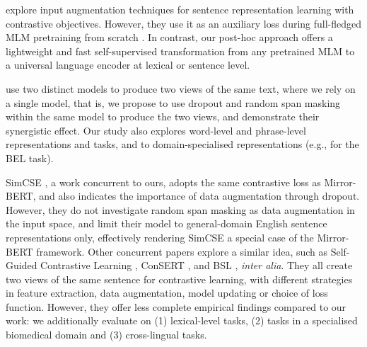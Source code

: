 \documentclass[11pt]{article}
\begin{document}
\citet{wu2020clear} explore input augmentation techniques for sentence representation learning with contrastive objectives. However, they use it as an auxiliary loss during full-fledged MLM pretraining from scratch \citep{rethmeier2021primer}. In contrast, our post-hoc approach offers a lightweight and fast self-supervised transformation from any pretrained MLM to a universal language encoder at lexical or sentence level.


\citet{carlsson2021semantic} use two distinct models to produce two views of the same text, where we rely on a single model, that is, we propose to use dropout and random span masking within the same model to produce the two views, and demonstrate their synergistic effect. Our study also explores word-level and phrase-level representations and tasks, and to domain-specialised representations (e.g., for the BEL task).


SimCSE \citep{gao2021simcse}, a work concurrent to ours, adopts the same contrastive loss as Mirror-BERT, and also indicates the importance of data augmentation through dropout. However, they do not investigate random span masking as data augmentation in the input space, and limit their model to general-domain English sentence representations only, effectively rendering SimCSE a special case of the Mirror-BERT framework.
Other concurrent papers explore a similar idea, such as Self-Guided Contrastive Learning \citep{kim-etal-2021-self}, ConSERT \citep{yan-etal-2021-consert}, and BSL \citep{zhang-etal-2021-bootstrapped}, \textit{inter alia}. They all create two views of the same sentence for contrastive learning, with different strategies in feature extraction, data augmentation, model updating or choice of loss function. However, they offer less complete empirical findings compared to our work: we additionally evaluate on (1) lexical-level tasks, (2) tasks in a specialised biomedical domain and (3) cross-lingual tasks.

















\iffalse
\end{document}
